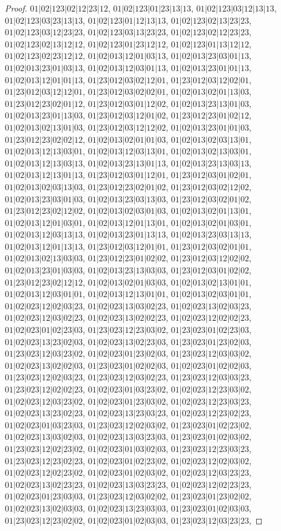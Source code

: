 \documentclass[12pt]{article}
\theoremstyle{plain}
\theoremstyle{definition}
\theoremstyle{remark}
\begin{document}
\begin{proof}
$01|02|123|02|12|23|12$, $01|02|123|01|23|13|13$, $01|02|123|03|12|13|13$, $01|02|123|03|23|13|13$, $01|02|123|01|12|13|13$, $01|02|123|02|13|23|23$, $01|02|123|03|12|23|23$, $01|02|123|03|13|23|23$, $01|02|123|02|12|23|23$, $01|02|123|02|13|12|12$, $01|02|123|01|23|12|12$, $01|02|123|01|13|12|12$, $01|02|123|02|23|12|12$, $01|02|013|12|01|03|13$, $01|02|013|23|03|01|13$, $01|02|013|23|01|03|13$, $01|02|013|12|03|01|13$, $01|02|013|23|01|01|13$, $01|02|013|12|01|01|13$, $01|23|012|03|02|12|01$, $01|23|012|03|12|02|01$, $01|23|012|03|12|12|01$, $01|23|012|03|02|02|01$, $01|02|013|02|01|13|03$, $01|23|012|23|02|01|12$, $01|23|012|03|01|12|02$, $01|02|013|23|13|01|03$, $01|02|013|23|01|13|03$, $01|23|012|03|12|01|02$, $01|23|012|23|01|02|12$, $01|02|013|02|13|01|03$, $01|23|012|03|12|12|02$, $01|02|013|23|01|01|03$, $01|23|012|23|02|02|12$, $01|02|013|02|01|01|03$, $01|02|013|02|03|13|01$, $01|02|013|12|13|03|01$, $01|02|013|12|03|13|01$, $01|02|013|02|13|03|01$, $01|02|013|12|13|03|13$, $01|02|013|23|13|01|13$, $01|02|013|23|13|03|13$, $01|02|013|12|13|01|13$, $01|23|012|03|01|12|01$, $01|23|012|03|01|02|01$, $01|02|013|02|03|13|03$, $01|23|012|23|02|01|02$, $01|23|012|03|02|12|02$, $01|02|013|23|03|01|03$, $01|02|013|23|03|13|03$, $01|23|012|03|02|01|02$, $01|23|012|23|02|12|02$, $01|02|013|02|03|01|03$, $01|02|013|02|01|13|01$, $01|02|013|12|01|03|01$, $01|02|013|12|01|13|01$, $01|02|013|02|01|03|01$, $01|02|013|12|03|13|13$, $01|02|013|23|01|13|13$, $01|02|013|23|03|13|13$, $01|02|013|12|01|13|13$, $01|23|012|03|12|01|01$, $01|23|012|03|02|01|01$, $01|02|013|02|13|03|03$, $01|23|012|23|01|02|02$, $01|23|012|03|12|02|02$, $01|02|013|23|01|03|03$, $01|02|013|23|13|03|03$, $01|23|012|03|01|02|02$, $01|23|012|23|02|12|12$, $01|02|013|02|01|03|03$, $01|02|013|02|13|01|01$, $01|02|013|12|03|01|01$, $01|02|013|12|13|01|01$, $01|02|013|02|03|01|01$, $01|02|023|12|02|03|23$, $01|02|023|13|03|02|23$, $01|02|023|13|02|03|23$, $01|02|023|12|03|02|23$, $01|02|023|13|02|02|23$, $01|02|023|12|02|02|23$, $01|02|023|01|02|23|03$, $01|23|023|12|23|03|02$, $01|23|023|01|02|23|03$, $01|02|023|13|23|02|03$, $01|02|023|13|02|23|03$, $01|23|023|01|23|02|03$, $01|23|023|12|03|23|02$, $01|02|023|01|23|02|03$, $01|23|023|12|03|03|02$, $01|02|023|13|02|02|03$, $01|23|023|01|02|02|03$, $01|02|023|01|02|02|03$, $01|23|023|12|02|03|23$, $01|23|023|12|03|02|23$, $01|23|023|12|03|03|23$, $01|23|023|12|02|02|23$, $01|02|023|01|03|23|02$, $01|02|023|12|23|03|02$, $01|02|023|12|03|23|02$, $01|02|023|01|23|03|02$, $01|02|023|12|23|03|23$, $01|02|023|13|23|02|23$, $01|02|023|13|23|03|23$, $01|02|023|12|23|02|23$, $01|02|023|01|03|23|03$, $01|23|023|12|02|03|02$, $01|23|023|01|02|23|02$, $01|02|023|13|03|02|03$, $01|02|023|13|03|23|03$, $01|23|023|01|02|03|02$, $01|23|023|12|02|23|02$, $01|02|023|01|03|02|03$, $01|23|023|12|23|03|23$, $01|23|023|12|23|02|23$, $01|02|023|01|02|23|02$, $01|02|023|12|02|03|02$, $01|02|023|12|02|23|02$, $01|02|023|01|02|03|02$, $01|02|023|12|03|23|23$, $01|02|023|13|02|23|23$, $01|02|023|13|03|23|23$, $01|02|023|12|02|23|23$, $01|02|023|01|23|03|03$, $01|23|023|12|03|02|02$, $01|23|023|01|23|02|02$, $01|02|023|13|02|03|03$, $01|02|023|13|23|03|03$, $01|23|023|01|02|03|03$, $01|23|023|12|23|02|02$, $01|02|023|01|02|03|03$, $01|23|023|12|03|23|23$, 
\end{proof}
\end{document}
